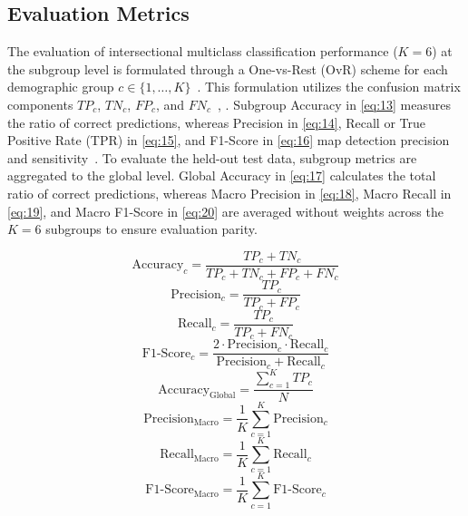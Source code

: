 \subsection{Evaluation Metrics}
\label{sec:evaluation_metrics}

The evaluation of intersectional multiclass classification performance ($K = 6$) at the subgroup level is formulated through a One-vs-Rest (OvR) scheme for each demographic group $c \in \{1, \dots, K\}$~\cite{ref44}. This formulation utilizes the confusion matrix components $TP_c$, $TN_c$, $FP_c$, and $FN_c$~\cite{ref45}, \cite{ref46}. Subgroup Accuracy in \eqref{eq:13} measures the ratio of correct predictions, whereas Precision in \eqref{eq:14}, Recall or True Positive Rate (TPR) in \eqref{eq:15}, and F1-Score in \eqref{eq:16} map detection precision and sensitivity~\cite{ref47}. To evaluate the held-out test data, subgroup metrics are aggregated to the global level. Global Accuracy in \eqref{eq:17} calculates the total ratio of correct predictions, whereas Macro Precision in \eqref{eq:18}, Macro Recall in \eqref{eq:19}, and Macro F1-Score in \eqref{eq:20} are averaged without weights across the $K = 6$ subgroups to ensure evaluation parity.

\begin{equation}
\text{Accuracy}_c = \frac{TP_c + TN_c}{TP_c + TN_c + FP_c + FN_c}
\label{eq:13}
\end{equation}
\begin{equation}
\text{Precision}_c = \frac{TP_c}{TP_c + FP_c}
\label{eq:14}
\end{equation}
\begin{equation}
\text{Recall}_c = \frac{TP_c}{TP_c + FN_c}
\label{eq:15}
\end{equation}
\begin{equation}
\text{F1-Score}_c = \frac{2 \cdot \text{Precision}_c \cdot \text{Recall}_c}{\text{Precision}_c + \text{Recall}_c}
\label{eq:16}
\end{equation}
\begin{equation}
\text{Accuracy}_{\text{Global}} = \frac{\sum_{c=1}^K TP_c}{N}
\label{eq:17}
\end{equation}
\begin{equation}
\text{Precision}_{\text{Macro}} = \frac{1}{K} \sum_{c=1}^K \text{Precision}_c
\label{eq:18}
\end{equation}
\begin{equation}
\text{Recall}_{\text{Macro}} = \frac{1}{K} \sum_{c=1}^K \text{Recall}_c
\label{eq:19}
\end{equation}
\begin{equation}
\text{F1-Score}_{\text{Macro}} = \frac{1}{K} \sum_{c=1}^K \text{F1-Score}_c
\label{eq:20}
\end{equation}

